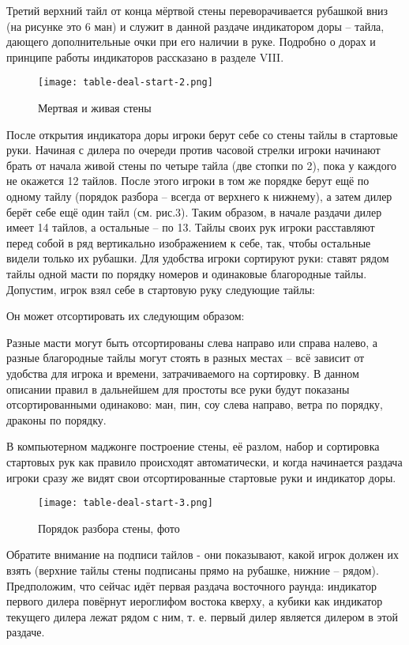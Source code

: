 Третий верхний тайл от конца мёртвой стены переворачивается рубашкой вниз (на рисунке это 6 ман) и служит в данной раздаче индикатором доры – тайла, дающего дополнительные очки при его наличии в руке. Подробно о дорах и принципе работы индикаторов рассказано в разделе VIII.

\begin{figure}[H]
	\centering
	\texttt{[image: table-deal-start-2.png]}
	\caption{Мертвая и живая стены}
\end{figure}

После открытия индикатора доры игроки берут себе со стены тайлы в стартовые руки. Начиная с дилера по очереди против часовой стрелки игроки начинают брать от начала живой стены по четыре тайла (две стопки по 2), пока у каждого не окажется 12 тайлов. После этого игроки в том же порядке берут ещё по одному тайлу (порядок разбора – всегда от верхнего к нижнему), а затем дилер берёт себе ещё один тайл (см. рис.3). Таким образом, в начале раздачи дилер имеет 14 тайлов, а остальные – по 13. Тайлы своих рук игроки расставляют перед собой в ряд вертикально изображением к себе, так, чтобы остальные видели только их рубашки. Для удобства игроки сортируют руки: ставят рядом тайлы одной масти по порядку номеров и одинаковые благородные тайлы. Допустим, игрок взял себе в стартовую руку следующие тайлы:


Он может отсортировать их следующим образом:


Разные масти могут быть отсортированы слева направо или справа налево, а разные благородные тайлы могут стоять в разных местах – всё зависит от удобства для игрока и времени, затрачиваемого на сортировку. В данном описании правил в дальнейшем для простоты все руки будут показаны отсортированными одинаково: ман, пин, соу слева направо, ветра по порядку, драконы по порядку.

В компьютерном маджонге построение стены, её разлом, набор и сортировка стартовых рук как правило происходят автоматически, и когда начинается раздача игроки сразу же видят свои отсортированные стартовые руки и индикатор доры. 

\begin{figure}[H]
	\centering
	\texttt{[image: table-deal-start-3.png]}
	\caption{Порядок разбора стены, фото}
\end{figure}

Обратите внимание на подписи тайлов - они показывают, какой игрок должен их взять (верхние тайлы стены подписаны прямо на рубашке, нижние – рядом). Предположим, что сейчас идёт первая раздача восточного раунда: индикатор первого дилера повёрнут иероглифом востока кверху, а кубики как индикатор текущего дилера лежат рядом с ним, т. е. первый дилер является дилером в этой раздаче.

